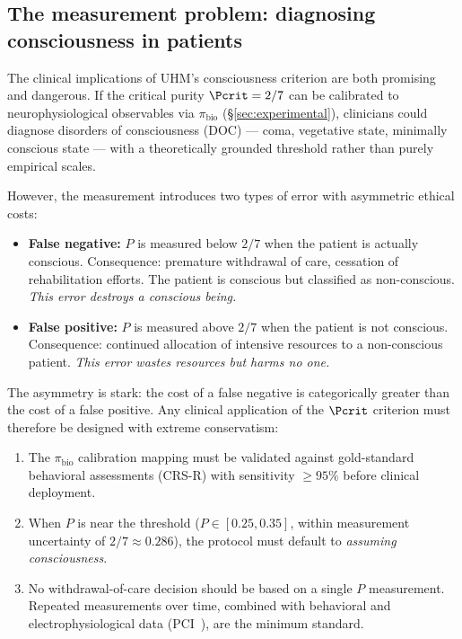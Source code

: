 \subsection{The measurement problem: diagnosing consciousness in patients}
\label{subsec:doc-ethics}

The clinical implications of UHM's consciousness criterion are both promising and
dangerous.  If the critical purity $\Pcrit = 2/7$ can be calibrated to neurophysiological
observables via $\pi_{\mathrm{bio}}$ (\S\ref{sec:experimental}), clinicians could
diagnose disorders of consciousness (DOC) --- coma, vegetative state, minimally conscious
state --- with a theoretically grounded threshold rather than purely empirical scales.

However, the measurement introduces two types of error with asymmetric ethical costs:

\begin{itemize}[leftmargin=2em]
  \item \textbf{False negative:} $P$ is measured below $2/7$ when the patient is
        actually conscious.  Consequence: premature withdrawal of care, cessation of
        rehabilitation efforts.  The patient is conscious but classified as non-conscious.
        \emph{This error destroys a conscious being.}
  \item \textbf{False positive:} $P$ is measured above $2/7$ when the patient is
        not conscious.  Consequence: continued allocation of intensive resources to
        a non-conscious patient.  \emph{This error wastes resources but harms no one.}
\end{itemize}

The asymmetry is stark: the cost of a false negative is categorically greater than the
cost of a false positive.  Any clinical application of the $\Pcrit$ criterion must
therefore be designed with extreme conservatism:

\begin{enumerate}[leftmargin=2em]
  \item The $\pi_{\mathrm{bio}}$ calibration mapping must be validated against gold-standard
        behavioral assessments (CRS-R) with sensitivity $\geq 95\%$ before clinical
        deployment.
  \item When $P$ is near the threshold ($P \in [0.25, 0.35]$, within measurement
        uncertainty of $2/7 \approx 0.286$), the protocol must default to
        \emph{assuming consciousness}.
  \item No withdrawal-of-care decision should be based on a single $P$ measurement.
        Repeated measurements over time, combined with behavioral and
        electrophysiological data (PCI~\cite{casali2013}), are the minimum standard.
\end{enumerate}

